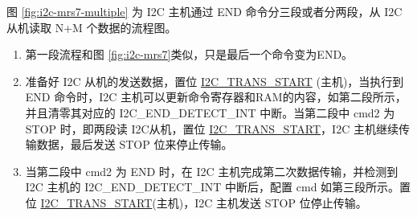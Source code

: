 \documentclass[main\_\_CN.tex]{subfiles}
\begin{document}
图 \ref{fig:i2c-mrs7-multiple} 为 I2C 主机通过 END 命令分三段或者分两段，从 I2C 从机读取 N+M 个数据的流程图。
\begin{enumerate}
    \item 第一段流程和图 \ref{fig:i2c-mrs7}类似，只是最后一个命令变为END。
    \item 准备好 I2C 从机的发送数据，置位 \hyperref[fielddesc:I2CTRANSSTART]{I2C\_TRANS\_START} (主机)，当执行到 END 命令时，I2C 主机可以更新命令寄存器和RAM的内容，如第二段所示，并且清零其对应的 I2C\_END\_DETECT\_INT 中断。当第二段中 cmd2 为 STOP 时，即两段读 I2C从机，置位 \hyperref[fielddesc:I2CTRANSSTART]{I2C\_TRANS\_START}，I2C 主机继续传输数据，最后发送 STOP 位来停止传输。
    \item 当第二段中 cmd2 为 END 时，在 I2C 主机完成第二次数据传输，并检测到 I2C 主机的 I2C\_END\_DETECT\_INT 中断后，配置 cmd 如第三段所示。置位 \hyperref[fielddesc:I2CTRANSSTART]{I2C\_TRANS\_START}(主机)，I2C 主机发送 STOP 位停止传输。
\end{enumerate}
\end{document}
